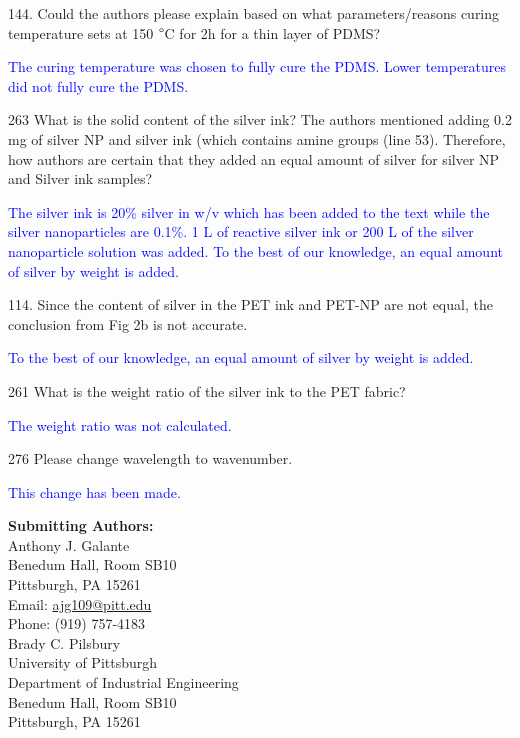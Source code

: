 \documentclass[12pt]{letter}
\newcommand{\blue}[1]{\textcolor{blue}{#1}} %
\begin{document}
144. Could the authors please explain based on what parameters/reasons curing temperature sets at 150 $\degree$C for 2h for a thin layer of PDMS?

\blue{The curing temperature was chosen to fully cure the PDMS. Lower temperatures did not fully cure the PDMS. }

263 What is the solid content of the silver ink?
The authors mentioned adding 0.2 mg of silver NP and silver ink (which contains amine groups (line 53). Therefore, how authors are certain that they added an equal amount of silver for silver NP and Silver ink samples?

\blue{The silver ink is 20\% silver in w/v which has been added to the text while the silver nanoparticles are 0.1\%. 1 \micro L of reactive silver ink or 200 \micro L of the silver nanoparticle solution was added. To the best of our knowledge, an equal amount of silver by weight is added. }

114. Since the content of silver in the PET ink and PET-NP are not equal, the conclusion from Fig 2b is not accurate.

\blue{To the best of our knowledge, an equal amount of silver by weight is added.}

261 What is the weight ratio of the silver ink to the PET fabric?

\blue{The weight ratio was not calculated. }

276 Please change wavelength to wavenumber.

\blue{This change has been made. }

\newpage


\textbf{Submitting Authors:}\\
Anthony J. Galante\\
Benedum Hall, Room SB10 \\
Pittsburgh, PA 15261\\
Email:  \href{mailto:ajg109@pitt.edu}{ajg109@pitt.edu}\\
Phone: (919) 757-4183\\

Brady C. Pilsbury \\
University of Pittsburgh \\
Department of Industrial Engineering \\
Benedum Hall, Room SB10 \\
Pittsburgh, PA 15261\\
\end{document}
